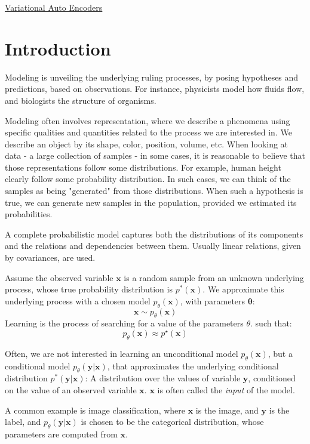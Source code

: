 \documentclass{article}
\begin{document}
\begin{center}
{\huge \underline{Variational Auto Encoders}}
\end{center}
\section{Introduction}

\begin{definition}[Modeling] Modeling is unveiling the underlying ruling processes, by posing hypotheses and predictions, based on observations. For instance, physicists model how fluids flow, and biologists the  structure of organisms. 

Modeling often involves representation, where we describe a phenomena using specific qualities and quantities related to the process we are interested in. We describe an object by its shape, color, position, volume, etc. 
When looking at data - a large collection of samples - in some cases, it is reasonable to believe that those representations follow some distributions. For example, human height clearly follow some probability distribution. In such cases, we can think of the samples as being "generated" from those distributions. When such a hypothesis is true, we can generate new samples in the population, provided we estimated its probabilities. 
\end{definition}

\begin{remark} A complete probabilistic model captures both the distributions  of its components and the relations and dependencies between them. Usually linear relations, given by covariances, are used. 
\end{remark}

\begin{definition}  Assume the observed variable $\bm{x}$ is a random sample from an unknown underlying process, whose true probability distribution is $p^{\ast}(\bm{x})$. We approximate this underlying process with a chosen model $p_{\theta}(\bm{x})$, with parameters $\bm{\theta}$:
\[
  \bm{x} \sim p_{\theta}(\bm{x}) 
\]
Learning is the process of searching for a value of the parameters $\theta$. such that:
\[
  p_{\theta}(\bm{x}) \approx p ^{\star}(\bm{x}) 
\]
\end{definition}

\begin{definition} Often, we are not interested in learning an unconditional model $p_{\theta}(\bm{x})$, but a conditional model $p_{\theta}(\bm{y} | \bm{x})$, that approximates the underlying conditional distribution $p ^{\ast}(\bm{y} | \bm{x})$: A distribution over the values of variable $\bm{y}$, conditioned on the value of an observed variable $\bm{x}$. $\bm{x}$ is often called the \textit{input} of the model. 

A common example is image classification, where $\bm{x}$ is the image, and $\bm{y}$ is the label, and $p_{\theta}(\bm{y}|\bm{x})$ is chosen to be the categorical distribution, whose parameters are computed from $\bm{x}$. 
\end{definition}
\end{document}
